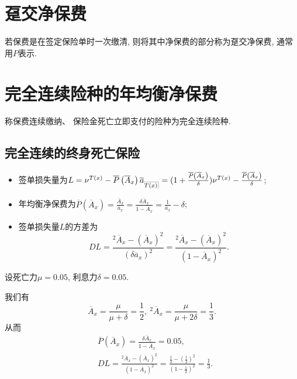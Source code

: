 \documentclass[lang=cn,10pt]{elegantbook}
\makeatletter
\DeclareRobustCommand{\annu}[1]{_{%
    \def\arraystretch{0}%
    \setlength\arraycolsep{1pt}%
    \setlength\arrayrulewidth{.2pt}%
    \begin{array}[b]{@{}c|}\hline
        \\[\arraycolsep]%
        \scriptstyle #1%
    \end{array}%
}}
\makeatother
\begin{document}
\section{趸交净保费}
\begin{definition}[趸交净保费]
    若保费是在签定保险单时一次缴清, 则将其中净保费的部分称为趸交净保费, 通常用$P$表示.
\end{definition}

\section{完全连续险种的年均衡净保费}
\begin{definition}
    称保费连续缴纳、 保险金死亡立即支付的险种为完全连续险种.
\end{definition}
\subsection{完全连续的终身死亡保险}
\begin{proposition}
    \begin{itemize}
        \item 签单损失量为$L=\nu^{T(x)}-\overline{P}\left( \overline{A}_x \right)\overline a_{\annu {T(x)}}=(1+\frac{\overline{P}\left( \overline{A}_x \right)}{\delta})\nu^{T(x)}-\frac{\overline{P}\left( \overline{A}_x \right)}{\delta}$;
        \item 年均衡净保费为$\overline{P}\left( \overline{A}_x \right)=\frac{\overline A_x}{\overline a_x}=\frac{\delta\overline A_x}{1-\overline A_x}=\frac{1}{\overline a_x}-\delta$;
        \item 签单损失量$L$的方差为
$$DL=\frac{^2\overline A_x-(\overline A_x)^2}{(\delta\overline a_x)^2}=\frac{^2\overline A_x-(\overline A_x)^2}{(1-\overline A_x)^2}.$$
    \end{itemize}
\end{proposition}

\begin{example}
    设死亡力$\mu=0.05$, 利息力$\delta=0.05.$
\end{example}
\begin{solution}
    我们有
$$\overline A_x=\frac{\mu}{\mu+\delta}=\frac{1}{2},\ {}^2\overline A_x=\frac{\mu}{\mu+2\delta}=\frac{1}{3}.$$
从而
\begin{align*}
    &\overline{P}\left( \overline{A}_x \right)=\frac{\delta\overline A_x}{1-\overline A_x}=0.05,\\
    &DL=\frac{^2\overline A_x-(\overline A_x)^2}{(1-\overline A_x)^2}=\frac{\frac{1}{3}-(\frac{1}{2})^2}{(1-\frac{1}{2})^2}=\frac{1}{3}.
\end{align*}

\end{solution}
\end{document}
